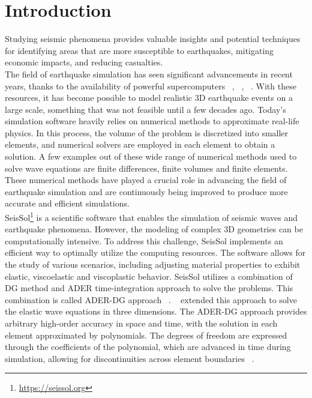 
\chapter{Introduction}\label{chapter:introduction}

Studying seismic phenomena provides valuable insights and potential techniques for identifying areas that are more susceptible to earthquakes, mitigating economic impacts, 
and reducing casualties. \\

The field of earthquake simulation has seen significant advancements in recent years, thanks to the availability of powerful supercomputers ~\parencite{inproceedings}, ~\parencite{breuer}, ~\parencite{seissol}.
With these resources, it has become possible to model realistic 3D earthquake events on a large scale, something that was not feasible until a few decades ago. 
Today's simulation software heavily relies on numerical methods to approximate real-life physics. In this process, the volume of the problem is discretized into smaller elements, and numerical solvers are employed in each element to obtain a solution.
A few examples out of these wide range of numerical methods used to solve wave equations are finite differences, finite volumes and finite elements. These numerical methods have played a crucial role in advancing the field of earthquake simulation and are continuously being improved to produce more accurate and efficient simulations. \\

SeisSol\footnote{\href{https://seissol.org}{https://seissol.org}} is a scientific software that enables the simulation of seismic waves and earthquake phenomena. 
However, the modeling of complex 3D geometries can be computationally intensive. To address this challenge, SeisSol implements an efficient way to optimally utilize the computing resources. 
The software allows for the study of various scenarios, including adjusting material properties to exhibit elastic, viscoelastic and viscoplastic behavior.
SeisSol utilizes a combination of \acf{DG} method and \acf{ADER} time-integration approach to solve the problems.
This combination is called \ac{ADER}-\ac{DG} approach ~\parencite{dumbser}. ~\parencite{dumbser1} extended this approach to solve the elastic wave equations in three dimensions. The \ac{ADER}-\ac{DG} approach provides arbitrary high-order accuracy in space and time, with the solution in each element approximated by polynomials.
The degrees of freedom are expressed through the coefficients of the polynomial, which are advanced in time during simulation, allowing for discontinuities across element boundaries ~\parencite{martin}. \\

